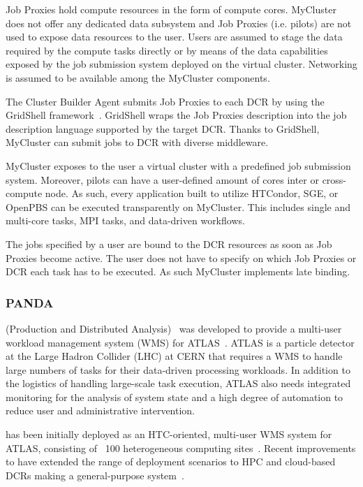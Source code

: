 \documentclass{sig-alternate}
\begin{document}
Job Proxies hold compute resources in the form of compute cores. MyCluster does
not offer any dedicated data subsystem and Job Proxies (i.e. pilots) are not
used to expose data resources to the user. Users are assumed to stage the data
required by the compute tasks directly or by means of the data capabilities
exposed by the job submission system deployed on the virtual cluster. Networking
is assumed to be available among the MyCluster components.

The Cluster Builder Agent submits Job Proxies to each DCR by using the GridShell
framework~\cite{walker2004gridshell}. GridShell wraps the Job Proxies
description into the job description language supported by the target DCR. Thanks to GridShell, MyCluster can submit jobs to DCR with diverse middleware.

MyCluster exposes to the user a virtual cluster with a predefined job submission
system. Moreover, pilots can have a user-defined amount of cores inter or
cross-compute node. As such, every application built to utilize HTCondor, SGE,
or OpenPBS can be executed transparently on MyCluster. This includes single and
multi-core tasks, MPI tasks, and data-driven workflows.

The jobs specified by a user are bound to the DCR resources as soon as Job
Proxies become active. The user does not have to specify on which Job Proxies or
DCR each task has to be executed. As such MyCluster implements late binding.

%
\subsubsection{PANDA}
\label{sec:panda}

\panda (Production and Distributed Analysis)~\cite{zhao2011panda} was
developed to provide a multi-user workload management system (WMS) for
ATLAS~\cite{aad2008atlas}. ATLAS is a particle detector at the Large Hadron
Collider (LHC) at CERN that requires a WMS to handle large numbers of tasks for
their data-driven processing workloads. In addition to the logistics of handling
large-scale task execution, ATLAS also needs integrated monitoring for the
analysis of system state and a high degree of automation to reduce user and
administrative intervention.

\panda has been initially deployed as an HTC-oriented, multi-user WMS system for
ATLAS, consisting of ~100 heterogeneous computing sites~\cite{maeno2012pd2p}.
Recent improvements to \panda have extended the range of deployment scenarios to
HPC and cloud-based DCRs making \panda a general-purpose \pilot
system~\cite{nilsson2012recentrp}.
\end{document}
